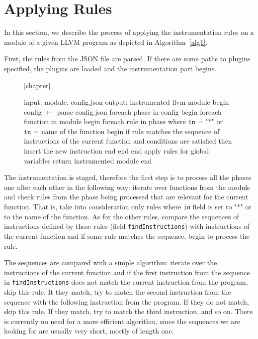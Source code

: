 \section{Applying Rules}

In this section, we describe the process of applying the instrumentation rules
on a module of a given LLVM program as depicted in
Algorithm~\ref{alg1}.


First, the rules from the JSON file are parsed. If there are some paths to
plugins specified, the plugins are loaded and the instrumentation part begins.

\begin{figure}[t]
[chapter] %

\begin{algorithm}[caption={Applying the instrumentation rules.}, label={alg1},columns=fullflexible]
 input: module, config.json
 output: instrumented llvm module
 begin
   config $\gets$ parse config.json
   foreach phase in config
   begin
      foreach function in module
      begin
         foreach rule in phase where $\texttt{in = "*"}$ or $\texttt{in =}$ name of the function
         begin
            if rule matches the sequence of instructions of the current function
               and conditions are satisfied then insert the new instruction
         end
      end
   end
   apply rules for global variables
   return instrumented module
 end
\end{algorithm}
\end{figure}

The instrumentation is staged, therefore the first step is to
process all the phases one after each other in the following way: iterate over
functions from the module and check rules from the phase being processed
that are relevant for the current function. That is, take into consideration
only rules where \texttt{in} field is set to "*" or to the name of the
function.  As for the other rules, compare the
sequences of instructions defined by these rules (field
\texttt{findInstructions}) with instructions of the current function and if
some rule matches the sequence, begin to process the rule.

The sequences are compared with a simple algorithm: iterate over the
instructions of the current function and if the first instruction from the
sequence in \texttt{findInstructions} does not match the current instruction
from the program, skip this rule. It they match, try to match the second
instruction from the sequence with the following instruction from the program.
If they do not match, skip this rule. If they match, try to match the third
instruction,
and so on. There is currently no need for a more efficient algorithm, since the
sequences we are looking for are usually very short, mostly of length one.

